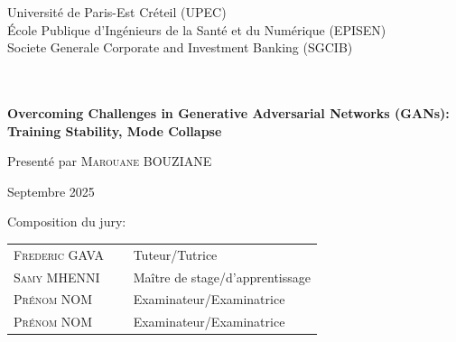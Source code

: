 \begin{titlepage}
\begin{center}
\begin{tabular}{c@{\hskip 1cm}c}
				

			\end{tabular}
		\end{center}
	\vspace*{-6mm}		
		\begin{center}

			Université de Paris-Est Créteil (UPEC)\\
			\'Ecole Publique d'Ingénieurs de la Santé et du Numérique (EPISEN)\\
			Societe Generale Corporate and Investment Banking (SGCIB)

  
  			\vfill
  			
	 		\HRule\\[-0.45cm] \HRule \\[0.1cm]
	 		 { \Large \bfseries Overcoming Challenges in Generative Adversarial Networks (GANs): Training Stability, Mode Collapse}
	  		\Hrule \\
		
		\end{center}
		
		\vfill
			
		\begin{center}
			Presenté par \textsc{\Large Marouane BOUZIANE}\\[1cm] 
		
	
			
			\vspace{2cm}
	
			Septembre 2025
		\end{center}
		
		\vspace{1cm}
			
		\vfill
		Composition du jury:
		\begin{center}
			\begin{tabular}{ll}
				\textsc{Frederic GAVA}   &  $\quad$ Tuteur/Tutrice\\
				\textsc{Samy MHENNI}   &  $\quad$ Maître de stage/d'apprentissage\\
				\textsc{Prénom NOM}   &  $\quad$ Examinateur/Examinatrice\\
				\textsc{Prénom NOM}   &  $\quad$ Examinateur/Examinatrice\\
			\end{tabular}\\[1cm]
		\end{center}

	\newpage
	\thispagestyle{empty}
	\end{titlepage}
